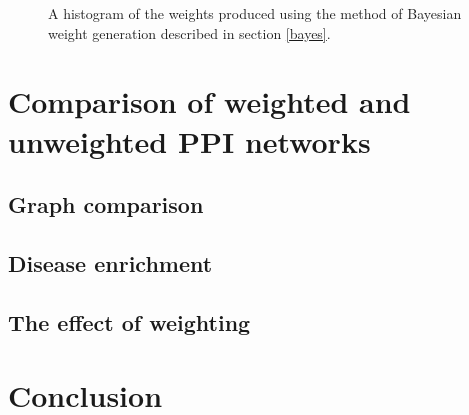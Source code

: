 \begin{figure}
    \centering
    \setlength\figureheight{3in}
    \setlength\figurewidth{4in}
    \caption{A histogram of the weights produced using the method of Bayesian weight generation described in section \ref{bayes}.}
    \label{fig:weightdist}
\end{figure}


\section{Comparison of weighted and unweighted PPI networks}




\subsection{Graph comparison}



\subsection{Disease enrichment}




\subsection{The effect of weighting}




\section*{Conclusion}


